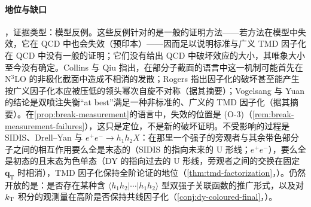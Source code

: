 \paragraph{地位与缺口}\tagV，证据类型：模型反例。这些反例针对的是一般的证明方法——若方法在模型中失效，它在 QCD 中也会失效\cite{Collins2007}（预印本）——因而足以说明标准与广义 TMD 因子化在 QCD 中没有一般的证明；它们没有给出 QCD 中破坏效应的大小，其唯象大小至今没有确定。Collins 与 Qiu 指出，在部分子截面的语言中这一机制可能首先在 N$^3$LO 的非极化截面中造成不相消的发散\cite{CollinsQiu2007}；Rogers 指出因子化的破坏甚至能产生按广义因子化本应被压低的领头幂次自旋不对称\cite{Rogers:2013zha}（据其摘要）；Vogelsang 与 Yuan 的结论是双喷注失衡“at best”满足一种非标准的、广义的 TMD 因子化\cite{Vogelsang:2007jk}（据其摘要）。在\cref{prop:break-measurement}的语言中，失效的位置是 (O-3)（\cref{rem:break-measurement-failures}），这只是定位，不是新的破坏证明。不受影响的过程是 SIDIS、Drell--Yan 与 $e^+e^-\to h_1h_2X$：在那里一个强子的旁观者与其余带色部分子之间的相互作用要么全是末态的（SIDIS 的指向未来的 U 形线；$e^+e^-$），要么全是初态的且末态为色单态（DY 的指向过去的 U 形线，旁观者之间的交换在固定 $\boldsymbol q_{\mathrm T}$ 时相消），TMD 因子化保持全阶论证的地位（\cref{thm:tmd-factorization}，\tagA）。仍然开放的是：是否存在某种含 $\langle h_1h_2|\cdots|h_1h_2\rangle$ 型双强子关联函数的推广形式，以及对 $k_{\mathrm{T}}$ 积分的观测量在高阶是否保持共线因子化（\cref{conj:dy-coloured-final}，\tagC）。

